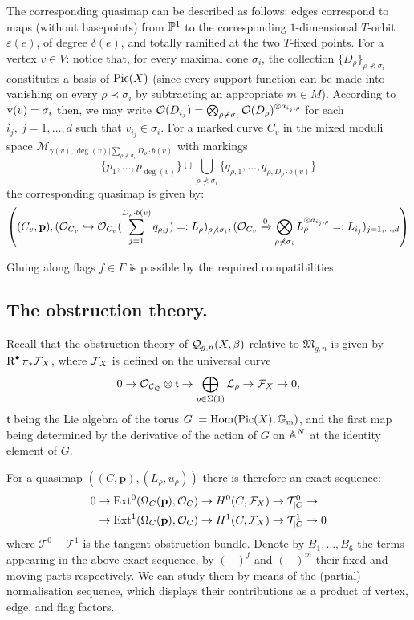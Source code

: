 The corresponding quasimap can be described as follows: edges correspond to maps (without basepoints) from $\mathbb P^1$ to the corresponding $1$-dimensional $T$-orbit $\varepsilon(e)$, of degree $\delta(e)$, and totally ramified at the two $T$-fixed points. For a vertex $v\in V$: notice that, for every maximal cone $\sigma_i$, the collection $\{D_\rho\}_{\rho\nprec\sigma_i}$ constitutes a basis of $\operatorname{Pic}(X)$ (since every support function can be made into vanishing on every $\rho\prec\sigma_i$ by subtracting an appropriate $m\in M$). According to $\operatorname{v}(v)=\sigma_i$ then, we may write $\mathcal{O}(D_{i_j})=\bigotimes_{\rho\nprec\sigma_i} \mathcal{O}(D_\rho)^{\otimes a_{i_j,\rho}}$ for each $i_j,\ j=1,\ldots,d$ such that $v_{i_j}\in \sigma_i$. For a marked curve $C_v$ in the mixed moduli space $\overline{\mathcal M}_{\gamma(v),\deg(v)|\sum_{\rho\nprec \sigma_i}D_\rho\cdot b(v)}$ with markings
\[
 \{p_1,\ldots,p_{\deg(v)}\}\cup\bigcup_{\rho\nprec\sigma_i}\{q_{\rho,1},\ldots,q_{\rho,D_{\rho}\cdot b(v)}\}
\]
the corresponding quasimap is given by:
\[
 \left((C_v,\mathbf p),(\mathcal O_{C_v}\hookrightarrow\mathcal{O}_{C_v}(\sum_{j=1}^{D_{\rho}\cdot b(v) }q_{\rho,j})=:L_\rho)_{\rho\nprec\sigma_i},(\mathcal O_{C_v}\xrightarrow{0}\bigotimes_{\rho\nprec\sigma_i} L_\rho^{\otimes a_{i_j,\rho}}=:L_{i_j})_{j=1,\ldots,d} \right)
\]

Gluing along flags $f\in F$ is possible by the required compatibilities.

\subsection{The obstruction theory.} Recall that the obstruction theory of $\mathcal{Q}_{g,n}(X,\beta)$ relative to $\mathfrak M_{g,n}$ is given by $\operatorname{R}^{\bullet}\pi_*\mathcal F_X$, where $\mathcal F_X$ is defined on the universal curve
\begin{equation}\label{eqn:F}
 0\rightarrow\mathcal{O}_{\mathcal C_\mathcal Q}\otimes \mathfrak t\rightarrow\bigoplus_{\rho\in\Sigma(1)}\mathcal L_\rho\rightarrow\mathcal F_X\rightarrow 0,
\end{equation}
$\mathfrak t$ being the Lie algebra of the torus $G:=\operatorname{Hom}(\operatorname{Pic}(X),\mathbb{G}_{\text{m}})$, and the first map being determined by the derivative of the action of $G$ on $\mathbb{A}^N$ at the identity element of $G$.

For a quasimap $\left((C,\mathbf p),(L_{\rho},u_{\rho})\right)$ there is therefore an exact sequence:
\begin{align*}
 0&\rightarrow \operatorname{Ext}^0(\Omega_C(\mathbf p),\mathcal{O}_C)\rightarrow H^0(C,\mathcal F_X)\rightarrow \mathcal T^0_{|C}\rightarrow \\
  &\rightarrow \operatorname{Ext}^1(\Omega_C(\mathbf p),\mathcal{O}_C)\rightarrow H^1(C,\mathcal F_X)\rightarrow \mathcal T^1_{|C}\rightarrow 0
\end{align*}
where $\mathcal T^0-\mathcal T^1$ is the tangent-obstruction bundle.
Denote by $B_1,\ldots, B_6$ the terms appearing in the above exact sequence, by $(-)^f$ and $(-)^m$ their fixed and moving parts respectively. We can study them by means of the (partial) normalisation sequence, which displays their contributions as a product of vertex, edge, and flag factors.


